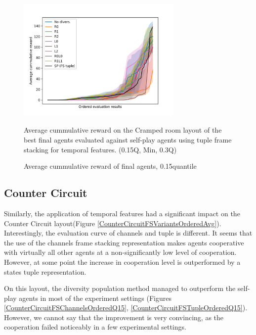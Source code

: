 \begin{figure}[!ht]
    \centering
    \includegraphics*[width=8cm]{../img/CrampedRoomFSTupleOrdered15Q.png}

    \caption{Average cummulative reward of final agents, 0.15quantile}
    \label{CrampedRoomFSTupleOrdered15Q}
    \medskip
    \small 
    Average cummulative reward on the Cramped room layout of the best final agents evaluated against self-play agents using tuple frame stacking for temporal features.
    (0.15Q, Min, 0.3Q)

\end{figure}

\newpage

\subsection{Counter Circuit}
Similarly, the application of temporal features had a significant impact on the Counter Circuit layout(Figure \ref{CounterCircuitFSVariantsOrderedAvg}).
Interestingly, the evaluation curve of channels and tuple is different. 
It seems that the use of the channels frame stacking representation makes agents cooperative with virtually all other agents at a non-significantly low level of cooperation.
However, at some point the increase in cooperation level is outperformed by a states tuple representation.

On this layout, the diversity population method managed to outperform the self-play agents in most of the experiment settings (Figures \ref {CounterCircuitFSChannelsOrderedQ15}, \ref {CounterCircuitFSTupleOrderedQ15}).
However, we cannot say that the improvement is very convincing, as the cooperation failed noticeably in a few experimental settings.



